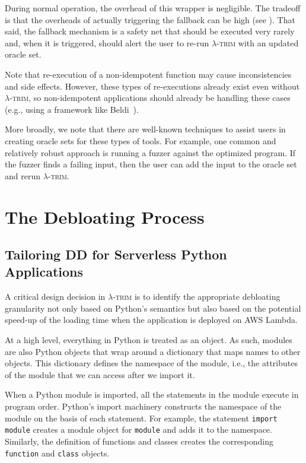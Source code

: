 \documentclass[sigplan,screen]{acmart}
\newcommand{\sys}{\textsc{\ensuremath{\lambda}-trim}\xspace}
\newcounter{example}
\newcommand{\module}[1]{{\texttt{#1}}}
\begin{document}
During normal operation, the overhead of this wrapper is negligible.
The tradeoff is that the overheads of actually triggering the fallback can be high (see ).
That said, the fallback mechanism is a safety net that should be executed very rarely and, when it is triggered, should alert the user to re-run \sys with an updated oracle set.

Note that re-execution of a non-idempotent function may cause inconsistencies and side effects.
However, these types of re-executions already exist even without \sys, so non-idempotent applications should already be handling these cases (e.g., using a framework like Beldi~\cite{beldi}).












More broadly, we note that there are well-known techniques to assist users in creating oracle sets for these types of tools.
For example, one common and relatively robust approach is running a fuzzer against the optimized program.
If the fuzzer finds a failing input, then the user can add the input to the oracle set and rerun \sys. 

 
\section{The Debloating Process}

\subsection{Tailoring DD for Serverless Python Applications}
\label{sec:debloating-tailoring}

A critical design decision in \sys is to identify the appropriate debloating granularity not only based on Python's semantics but also based on the potential speed-up of the loading time when the application is deployed on AWS Lambda.

At a high level, everything in Python is treated as an object.
As such, modules are also Python objects that wrap around a dictionary that maps names to other objects.
This dictionary defines the namespace of the module, i.e., the attributes of the module that we can access after we import it.

When a Python module is imported, all the statements in the module execute in program order.
Python's import machinery constructs the namespace of the module on the basis of each statement.
For example, the statement \verb|import module| creates a module object for \module{module} and adds it to the namespace.
Similarly, the definition of functions and classes creates the corresponding \verb|function| and \verb|class| objects.
\end{document}
